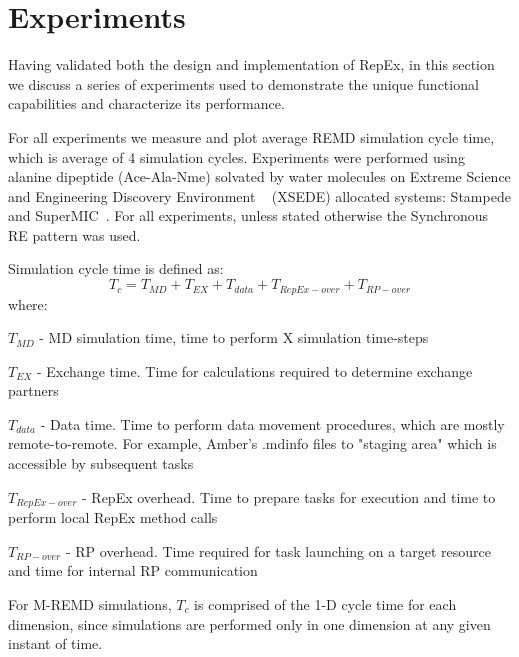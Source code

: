 \documentclass{sig-alternate-05-2015}
\begin{document}
\section{Experiments} \label{experiments}

Having validated both the design and implementation of RepEx, in this section we discuss a series of experiments used to demonstrate the unique functional capabilities and characterize its performance.

For all experiments we measure and plot average REMD simulation cycle time, which is average of 4 simulation cycles. Experiments were performed using alanine dipeptide (Ace-Ala-Nme) solvated by water molecules on Extreme Science and Engineering Discovery Environment ~\cite{xsede} (XSEDE) allocated systems: Stampede and SuperMIC~\cite{xsede}. For all experiments, unless stated otherwise the Synchronous RE pattern was used.

Simulation cycle time is defined as:   
\begin{equation}
T_{c} = T_{MD} + T_{EX} + T_{data} + T_{RepEx-over} + T_{RP-over}
\end{equation}
where:
\begin{compactitem}
  \item $T_{MD}$ - MD simulation time, time to perform X simulation time-steps  
  \item $T_{EX}$ - Exchange time. Time for calculations required to determine exchange partners
  \item $T_{data}$ - Data time. Time to perform data movement procedures, which are mostly remote-to-remote. For example, Amber's .mdinfo files to "staging area" which is accessible by subsequent tasks
  \item $T_{RepEx-over}$ - RepEx overhead. Time to prepare tasks for execution and time to perform local RepEx method calls
  \item $T_{RP-over}$ - RP overhead. Time required for task launching on a target resource and time for internal RP communication
\end{compactitem}

For M-REMD simulations, $T_c$ is comprised of the 1-D cycle time for each dimension, since simulations are performed only in one dimension at any given instant of time.
\end{document}
